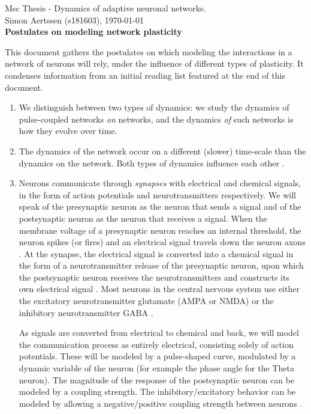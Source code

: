


\mainmatter


Msc Thesis - Dynamics of adaptive neuronal networks. \\
Simon Aertssen (s181603), \today \\ 

{\large \textbf{Postulates on modeling network plasticity}}

This document gathers the postulates on which modeling the interactions in a network of neurons will rely, under the influence of different types of plasticity. It condenses information from an initial reading list featured at the end of this document.

\begin{enumerate}
\item We distinguish between two types of dynamics: we study the dynamics of pulse-coupled networks \textsl{on} networks, and the dynamics \textsl{of} such networks is how they evolve over time.


\item The dynamics of the network occur on a different (slower) time-scale than the dynamics on the network. Both types of dynamics influence each other \cite{AdaptiveNetworks2009}.


\item Neurons communicate through \textsl{synapses} with electrical and chemical signals, in the form of action potentials and neurotransmitters respectively. We will speak of the presynaptic neuron as the neuron that sends a signal and of the postsynaptic neuron as the neuron that receives a signal. When the membrane voltage of a presynaptic neuron reaches an internal threshold, the neuron spikes (or fires) and an electrical signal travels down the neuron axons \cite{IntroductionModelingDynamics}. At the synapse, the electrical signal is converted into a chemical signal in the form of a neurotransmitter release of the presynaptic neuron, upon which the postsynaptic neuron receives the neurotransmitters and constructs its own electrical signal \cite{ActionPotentialsAndSynapses}. Most neurons in the central nervous system use either the excitatory neurotransmitter glutamate (AMPA or NMDA) or the inhibitory neurotransmitter GABA \cite{MathFoundationNeuroscience, Zhang2012}. 

As signals are converted from electrical to chemical and back, we will model the communication process as entirely electrical, consisting solely of action potentials. These will be modeled by a pulse-shaped curve, modulated by a dynamic variable of the neuron (for example the phase angle for the Theta neuron). The magnitude of the response of the postsynaptic neuron can be modeled by a coupling strength. The inhibitory/excitatory behavior can be modeled by allowing a negative/positive coupling strength between neurons \cite{Luke2013, Martens2020, Montbrio2015, OttAntonsen2017}.



\end{enumerate}

